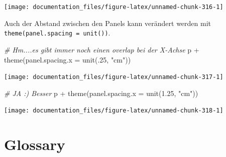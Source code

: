 \documentclass[
]{article}
\newenvironment{Shaded}{\begin{snugshade}}{\end{snugshade}}
\newcommand{\AttributeTok}[1]{\textcolor[rgb]{0.77,0.63,0.00}{#1}}
\newcommand{\CommentTok}[1]{\textcolor[rgb]{0.56,0.35,0.01}{\textit{#1}}}
\newcommand{\DecValTok}[1]{\textcolor[rgb]{0.00,0.00,0.81}{#1}}
\newcommand{\FloatTok}[1]{\textcolor[rgb]{0.00,0.00,0.81}{#1}}
\newcommand{\FunctionTok}[1]{\textcolor[rgb]{0.00,0.00,0.00}{#1}}
\newcommand{\NormalTok}[1]{#1}
\newcommand{\SpecialCharTok}[1]{\textcolor[rgb]{0.00,0.00,0.00}{#1}}
\newcommand{\StringTok}[1]{\textcolor[rgb]{0.31,0.60,0.02}{#1}}
\begin{document}
\begin{center}\texttt{[image: documentation\_files/figure-latex/unnamed-chunk-316-1]} \end{center}

Auch der Abstand zwischen den Panels kann verändert werden mit \texttt{theme(panel.spacing\ =\ unit())}.

\begin{Shaded}
\begin{Highlighting}[]
\CommentTok{\# Hm....es gibt immer noch einen overlap bei der X{-}Achse}
\NormalTok{p }\SpecialCharTok{+} \FunctionTok{theme}\NormalTok{(}\AttributeTok{panel.spacing.x =} \FunctionTok{unit}\NormalTok{(.}\DecValTok{25}\NormalTok{, }\StringTok{"cm"}\NormalTok{))}
\end{Highlighting}
\end{Shaded}

\begin{center}\texttt{[image: documentation\_files/figure-latex/unnamed-chunk-317-1]} \end{center}

\begin{Shaded}
\begin{Highlighting}[]
\CommentTok{\# JA :) Besser}
\NormalTok{p }\SpecialCharTok{+} \FunctionTok{theme}\NormalTok{(}\AttributeTok{panel.spacing.x =} \FunctionTok{unit}\NormalTok{(}\FloatTok{1.25}\NormalTok{, }\StringTok{"cm"}\NormalTok{))}
\end{Highlighting}
\end{Shaded}

\begin{center}\texttt{[image: documentation\_files/figure-latex/unnamed-chunk-318-1]} \end{center}

\hypertarget{glossary}{%
\section{Glossary}\label{glossary}}
\end{document}
